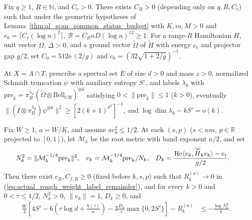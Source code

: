 \begin{lemma}
    \label{thm:arealaw-supplied-target-norm-bounds}
    \leanok
    Fix $q\geq1$, $R\in\mathbb N$, and $C_r>0$.
    There exists $C_B>0$ (depending only on $q,R,C_r$) such that under the geometric hypotheses of
    Lemma~\ref{thm:al_scan_common_status_budget} with $K,m,M>0$ and
    $r_0=\lceil C_r(\log n)^2\rceil$, $\mathcal B=C_BnD(\log n)^{12}\geq1$.
    For a range-$R$ Hamiltonian $H$, unit vector $\Omega$, $\Delta>0$, and a ground vector $\widetilde\Omega$ of $\widetilde H$ with energy $e_t$ and projector gap $g/2$, set
    $C_0=512\mathrm e\,(2/g)$ and $c_0=(32\sqrt{1+2/g})^{-1}$.

    At $X=A\cap T$, prescribe a spectral set $E$ of size $d>0$ and mass $z>0$, normalized Schmidt truncation $\psi$ with auxiliary entropy $S'$, and labels $\lambda_k$ with $\mathrm{pre}_k=\pi_R^{\lambda_k}(\widetilde\Omega\otimes\mathrm{Bell}_{CR})^{\otimes k}$ satisfying
    $0<\|\mathrm{pre}_k\|\leq1$ ($k>0$), eventually $\|(I\otimes\pi_R^{\lambda_k})\psi^{\otimes k}\|^2\geq[2(k+1)^{d^2}]^{-1}$, and $\log\dim\lambda_k-kS'=o(k)$.

    Fix $W\geq1$, $a=W/K$, and assume $ar_0^2\leq1/2$.
    At each $(s,p)$ ($s<nm$, $p\in\mathbb R$ projected to $[0,1]$), let $\mathcal M_k$ be the root metric with band exponent $a/2$, and set
    \begin{align}
        N_k^2 & =\|\mathcal M_k^{-1/4}\mathrm{pre}_k\|^2, &
        v_k   & =\mathcal M_k^{-1/4}\mathrm{pre}_k/N_k,   &
        D_k   & =\frac{\operatorname{Re}\langle v_k,
            \overline{\widetilde H}_k v_k\rangle-e_t}{g/2}.\notag
    \end{align}
    Then there exist $c_R,C_{f,R}\geq0$ (fixed before $k,s,p$) such that $R_k^{(a)}\to0$ in
    (\ref{eq:actual_rough_weight_label_remainder}), and for every $k>0$ and $0<\tau\leq1/2$, $N_k^2>0$, $\|v_k\|=1$, $D_k\geq0$, and
    \begin{align}
        \frac W4\left[4S'
            -6\left(\tau\log d+\frac{h(\tau)}a\right)
            -3\frac{D_k}{\tau}\max\{0,2S'\}\right]-R_k^{(a)}
         & \leq-\frac{\log N_k^2}{k}.
        \label{eq:arealaw-supplied-rough-lower}
    \end{align}


\end{lemma}
